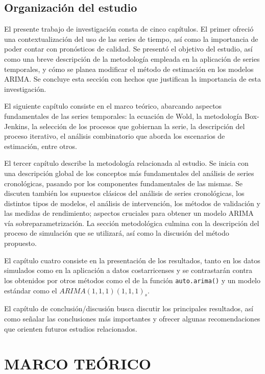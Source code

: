 \documentclass[
]{article}
\begin{document}
\subsection{Organización del estudio}

El presente trabajo de investigación consta de cinco capítulos. El
primer ofreció una contextualización del uso de las series de tiempo,
así como la importancia de poder contar con pronósticos de calidad. Se
presentó el objetivo del estudio, así como una breve descripción de la
metodología empleada en la aplicación de series temporales, y cómo se
planea modificar el método de estimación en los modelos ARIMA. Se
concluye esta sección con hechos que justifican la importancia de esta
investigación.

El siguiente capítulo consiste en el marco teórico, abarcando aspectos
fundamentales de las series temporales: la ecuación de Wold, la
metodología Box-Jenkins, la selección de los procesos que gobiernan la
serie, la descripción del proceso iterativo, el análisis combinatorio
que aborda los escenarios de estimación, entre otros.

El tercer capítulo describe la metodología relacionada al estudio. Se
inicia con una descripción global de los conceptos más fundamentales del
análisis de series cronológicas, pasando por los componentes
fundamentales de las mismas. Se discuten también los supuestos clásicos
del análisis de series cronológicas, los distintos tipos de modelos, el
análisis de intervención, los métodos de validación y las medidas de
rendimiento; aspectos cruciales para obtener un modelo ARIMA vía
sobreparametrización. La sección metodológica culmina con la descripción
del proceso de simulación que se utilizará, así como la discusión del
método propuesto.

El capítulo cuatro consiste en la presentación de los resultados, tanto
en los datos simulados como en la aplicación a datos costarricenses y se
contrastarán contra los obtenidos por otros métodos como el de la
función \texttt{auto.arima()} y un modelo estándar como el
\(ARIMA(1,1,1)(1,1,1)_s\).

El capítulo de conclusión/discusión busca discutir los principales
resultados, así como señalar las conclusiones más importantes y ofrecer
algunas recomendaciones que orienten futuros estudios relacionados.

\newpage

\section{MARCO TEÓRICO}
\end{document}
